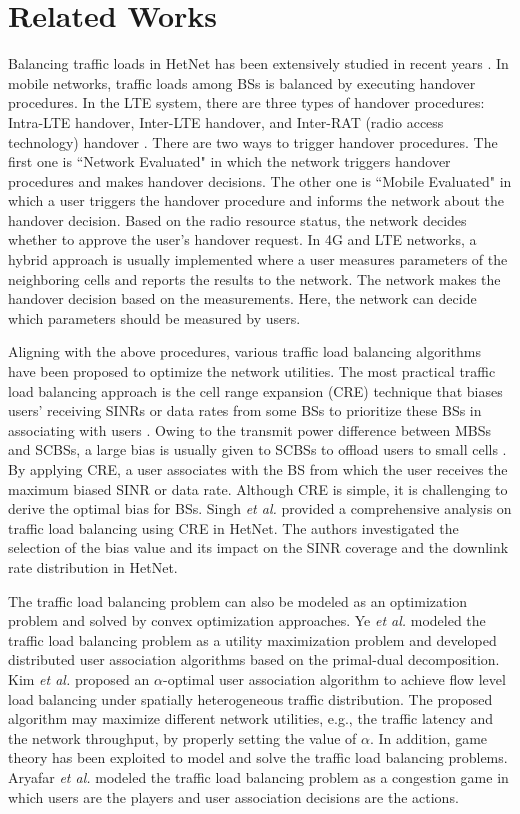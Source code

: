 \documentclass[journal]{IEEEtran}
\theoremstyle{definition}
\begin{document}
\section{Related Works}
\label{sec:related_work}
Balancing traffic loads in HetNet has been extensively studied in recent years \cite{Wang:2013:MMN}. In mobile networks, traffic loads among BSs is balanced by executing handover procedures. In the LTE system, there are three types of handover procedures: Intra-LTE handover, Inter-LTE handover, and Inter-RAT (radio access technology) handover \cite{LTE:2013:handover}. There are two ways to trigger handover procedures. The first one is ``Network Evaluated" in which the network triggers handover procedures and makes handover decisions. The other one is ``Mobile Evaluated" in which a user triggers the handover procedure and informs the network about the handover decision. Based on the radio resource status, the network decides whether to approve the user's handover request. In 4G and LTE networks, a hybrid approach is usually implemented where a user measures parameters of the neighboring cells and reports the results to the network. The network makes the handover decision based on the measurements. Here, the network can decide which parameters should be measured by users.

Aligning with the above procedures, various traffic load balancing algorithms have been proposed to optimize the network utilities. The most practical traffic load balancing approach is the cell range expansion (CRE) technique that biases users' receiving SINRs or data rates from some BSs to prioritize these BSs in associating with users \cite{Damn:2011:S3GPP}. Owing to the transmit power difference between MBSs and SCBSs, a large bias is usually given to SCBSs to offload users to small cells \cite{Andrews:2014:AOLB}. By applying CRE, a user associates with the BS from which the user receives the maximum biased SINR or data rate. Although CRE is simple, it is challenging to derive the optimal bias for BSs. Singh \emph{et al.} \cite{Singh:2013:OHN} provided a comprehensive analysis on traffic load balancing using CRE in HetNet. The authors investigated the selection of the bias value and its impact on the SINR coverage and the downlink rate distribution in HetNet.

The traffic load balancing problem can also be modeled as an optimization problem and solved by convex optimization approaches. Ye \emph{et al.} \cite{Ye:2013:UAL} modeled the traffic load balancing problem as a utility maximization problem and developed distributed user association algorithms based on the primal-dual decomposition. Kim \emph{et al.} \cite{Kim:2012:DOU} proposed an $\alpha$-optimal user association algorithm to achieve flow level load balancing under spatially heterogeneous traffic distribution. The proposed algorithm may maximize different network utilities, e.g., the traffic latency and the network throughput, by properly setting the value of $\alpha$. In addition, game theory has been exploited to model and solve the traffic load balancing problems. Aryafar \emph{et al.} \cite{Aryafar:2013:RSG} modeled the traffic load balancing problem as a congestion game in which users are the players and user association decisions are the actions.
\end{document}
